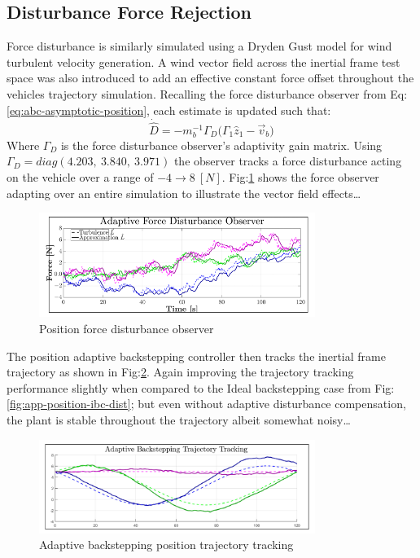 \subsection{Disturbance Force Rejection}
\label{subsec:simulation.disturbance.force}
Force disturbance is similarly simulated using a Dryden Gust model for wind turbulent velocity generation. A wind vector field across the inertial frame test space was also introduced to add an effective constant force offset throughout the vehicles trajectory simulation. Recalling the force disturbance observer from Eq:\ref{eq:abc-asymptotic-position}, each estimate is updated such that:
\begin{equation}
\dot{\hat{D}}=-m_b^{-1}\Gamma_D\Big(\Gamma_1\hat{z}_1-\vec{v}_b\Big)
\end{equation}
Where $\Gamma_D$ is the force disturbance observer's adaptivity gain matrix. Using $\Gamma_D=diag(4.203,~3.840,~3.971)$ the observer tracks a force disturbance acting on the vehicle over a range of $-4\rightarrow 8~[N]$. Fig:\ref{fig:force-observer} shows the force observer adapting over an entire simulation to illustrate the vector field effects\ldots
\begin{figure}[hbtp]
\vspace{-6pt}
\centering
\includegraphics[width=0.8\textwidth]{graphs/force-observer}
\caption{Position force disturbance observer}
\label{fig:force-observer}
\vspace{-16pt}
\end{figure}
\par
The position adaptive backstepping controller then tracks the inertial frame trajectory as shown in Fig:\ref{fig:ABC_Position_Trajectory}. Again improving the trajectory tracking performance slightly when compared to the Ideal backstepping case from Fig:\ref{fig:app-position-ibc-dist}; but even without adaptive disturbance compensation, the plant is stable throughout the trajectory albeit somewhat noisy\ldots
\begin{figure}[hbtp]
\centering
\includegraphics[width=0.8\textwidth]{graphs/ABC_Position_Trajectory}
\caption{Adaptive backstepping position trajectory tracking}
\label{fig:ABC_Position_Trajectory}
\end{figure}
